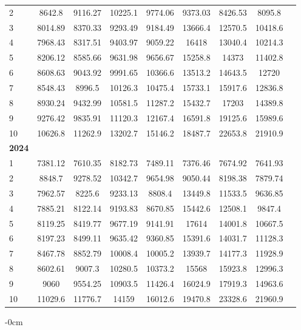 \documentclass[jmse,article,submit,pdftex,moreauthors]{Definitions/mdpi}
\begin{document}
\begin{longtable}{@{\extracolsep{\fill}}p{1.5cm}cccccccc@{}}
2 & 8642.8 & 9116.27 & 10225.1 & 9774.06 & 9373.03 & 8426.53 & 8095.8 \\
3 & 8014.89 & 8370.33 & 9293.49 & 9184.49 & 13666.4 & 12570.5 & 10418.6 \\
4 & 7968.43 & 8317.51 & 9403.97 & 9059.22 & 16418 & 13040.4 & 10214.3 \\
5 & 8206.12 & 8585.66 & 9631.98 & 9656.67 & 15258.8 & 14373 & 11402.8 \\
6 & 8608.63 & 9043.92 & 9991.65 & 10366.6 & 13513.2 & 14643.5 & 12720 \\
7 & 8548.43 & 8996.5 & 10126.3 & 10475.4 & 15733.1 & 15917.6 & 12836.8 \\
8 & 8930.24 & 9432.99 & 10581.5 & 11287.2 & 15432.7 & 17203 & 14389.8 \\
9 & 9276.42 & 9835.91 & 11120.3 & 12167.4 & 16591.8 & 19125.6 & 15989.6 \\
10 & 10626.8 & 11262.9 & 13202.7 & 15146.2 & 18487.7 & 22653.8 & 21910.9 \\
\hline
\bf{2024} &  &  &  & & & & \\
\hline 
1 & 7381.12 & 7610.35 & 8182.73 & 7489.11 & 7376.46 & 7674.92 & 7641.93 \\
2 & 8848.7 & 9278.52 & 10342.7 & 9654.98 & 9050.44 & 8198.38 & 7879.74 \\
3 & 7962.57 & 8225.6 & 9233.13 & 8808.4 & 13449.8 & 11533.5 & 9636.85 \\
4 & 7885.21 & 8122.14 & 9193.83 & 8670.85 & 15442.6 & 12508.1 & 9847.4 \\
5 & 8119.25 & 8419.77 & 9677.19 & 9141.91 & 17614 & 14001.8 & 10667.5 \\
6 & 8197.23 & 8499.11 & 9635.42 & 9360.85 & 15391.6 & 14031.7 & 11128.3 \\
7 & 8467.78 & 8852.79 & 10008.4 & 10005.2 & 13939.7 & 14177.3 & 11928.9 \\
8 & 8602.61 & 9007.3 & 10280.5 & 10373.2 & 15568 & 15923.8 & 12996.3 \\
9 & 9060 & 9554.25 & 10903.5 & 11426.4 & 16024.9 & 17919.3 & 14963.6 \\
10 & 11029.6 & 11776.7 & 14159 & 16012.6 & 19470.8 & 23328.6 & 21960.9 \\
\hline
\end{longtable}


\begin{adjustwidth}{-\extralength}{0cm}

\nocite{*}



\end{adjustwidth}
\end{document}
